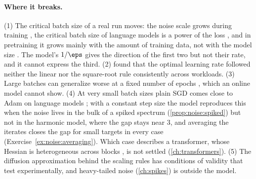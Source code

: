 \begin{refsection}
\paragraph{Where it breaks.} (1) The critical batch size of a real run moves: the noise scale grows during training \parencite{McCandlishEtAl2018}, the critical batch size of language models is a power of the loss \parencite{KaplanEtAl2020}, and in pretraining it grows mainly with the amount of training data, not with the model size \parencite{ZhangEtAl2025CBS}. The model's $1/\eps$ gives the direction of the first two but not their rate, and it cannot express the third. (2) \Textcite{ShallueEtAl2019} found that the optimal learning rate followed neither the linear nor the square-root rule consistently across workloads. (3) Large batches can generalize worse at a fixed number of epochs \parencite{KeskarEtAl2017,HofferHubaraSoudry2017}, which an online model cannot show. (4) At very small batch sizes plain SGD comes close to Adam on language models \parencite{MarekEtAl2025}; with a constant step size the model reproduces this when the noise lives in the bulk of a spiked spectrum (\cref{prop:noise:spiked}) but not in the harmonic model, where the gap stays near $3$, and averaging the iterates closes the gap for small targets in every case (Exercise~\ref{ex:noise:averaging}). Which case describes a transformer, whose Hessian is heterogeneous across blocks \parencite{ZhangEtAl2024Hessian}, is not settled (\cref{ch:transformers}). (5) The diffusion approximation behind the scaling rules has conditions of validity that \textcite{LiMalladiArora2021} test experimentally, and heavy-tailed noise (\cref{ch:spikes}) is outside the model.


\end{refsection}
